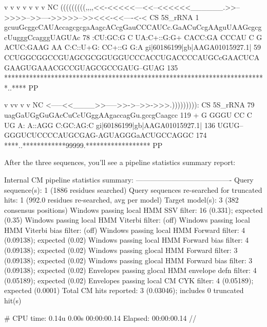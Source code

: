 \begin{sreoutput}
                                             v               v       v         v         v             v           v NC
                                     (((((((((,,,,<<-<<<<<---<<--<<<<<<______.>>-->>>>-->>---->>>>>-->><<<-<<----<-< CS
                         5S_rRNA   1 gcuuGcggcCAUAccagcgcgaAagcACcgGauCCCAUCc.GaACuCcgAAguUAAGcgcgcUugggCcagggUAGUAc 78 
                                     :CU:GC:G C UA:C+::G:G+   CACC:GA CCCAU C G ACUC:GAAG  AA C:C::U+G: CC+::G  G:A 
  gi|60186199|gb|AAGA01015927.1|  59 CCUGGCGGCCGUAGCGCGGUGGUCCCACCUGACCCCAUGCcGAACUCAGAAGUGAAACGCCGUAGCGCCGAUG--GUAG 135
                                     *************************************************************************..**** PP

                                     v                  vv         v v          NC
                                     <-----<<____>>----->>->-->>->>>.))))))))): CS
                         5S_rRNA  79 uagGaUGgGuGAcCuCcUGggAAgaccagGu.gccgCaagcc 119
                                      + G  GGGU  CC C UG  A: A::AGG   C:GC:AG:C
  gi|60186199|gb|AAGA01015927.1| 136 UGUG--GGGUCUCCCCAUGCGAG-AGUAGGGaACUGCCAGGC 174
                                     ****..************99999.****************** PP

\end{sreoutput}

After the three sequences, you'll see a pipeline statistics summary
report:

\begin{sreoutput}
Internal CM pipeline statistics summary:
----------------------------------------
Query sequence(s):                                               1  (1886 residues searched)
Query sequences re-searched for truncated hits:                  1  (992.0 residues re-searched, avg per model)
Target model(s):                                                 3  (382 consensus positions)
Windows   passing  local HMM SSV           filter:              16  (0.331); expected (0.35)
Windows   passing  local HMM Viterbi       filter:                  (off)
Windows   passing  local HMM Viterbi  bias filter:                  (off)
Windows   passing  local HMM Forward       filter:               4  (0.09138); expected (0.02)
Windows   passing  local HMM Forward  bias filter:               4  (0.09138); expected (0.02)
Windows   passing glocal HMM Forward       filter:               3  (0.09138); expected (0.02)
Windows   passing glocal HMM Forward  bias filter:               3  (0.09138); expected (0.02)
Envelopes passing glocal HMM envelope defn filter:               4  (0.05189); expected (0.02)
Envelopes passing  local CM  CYK           filter:               4  (0.05189); expected (0.0001)
Total CM hits reported:                                          3  (0.03046); includes 0 truncated hit(s)

# CPU time: 0.14u 0.00s 00:00:00.14 Elapsed: 00:00:00.14
//
\end{sreoutput}

